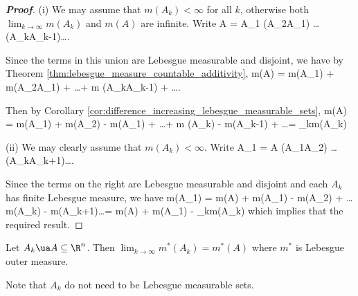 \begin{proof}[\bf Proof]
\ben
\item [(i)] We may assume that $m(A_k) < \infty$ for all $k$, otherwise both $\lim_{k\to \infty} m(A_k)$ and $m(A)$ are infinite. Write
\be
A = A_1 \cup (A_2\bs A_1) \cup \dots \cup (A_k\bs A_{k-1})\cup \dots.
\ee

Since the terms in this union are Lebesgue measurable and disjoint, we have by Theorem \ref{thm:lebesgue_measure_countable_additivity},
\be
m(A) = m(A_1) + m(A_2\bs A_1) + \dots + m (A_k\bs A_{k-1}) + \dots.
\ee

Then by Corollary \ref{cor:difference_increasing_lebesgue_measurable_sets}, 
\be
m(A) = m(A_1) + m(A_2) - m(A_1) + \dots + m (A_k) - m(A_{k-1}) + \dots = \lim_{k\to \infty}m(A_{k})
\ee

\item [(ii)] We may clearly assume that $m(A_k) < \infty$. Write
\be
A_1 = A \cup (A_1\bs A_2) \cup \dots \cup (A_k\bs A_{k+1})\cup \dots.
\ee

Since the terms on the right are Lebesgue measurable and disjoint and each $A_k$ has finite Lebesgue measure, we have
\be
m(A_1) =  m(A) + m(A_1) - m(A_2) + \dots  m(A_k) - m(A_{k+1})\cup \dots = m(A) + m(A_1) - \lim_{k\to \infty}m(A_{k})
\ee
which implies that the required result.
\een
\end{proof}

\begin{theorem}
Let $A_k\ua A\subseteq \R^n$. Then $\lim_{k\to \infty}m^*(A_{k}) = m^*(A)$ where $m^*$ is Lebesgue outer measure.
\end{theorem}

\begin{remark}
Note that $A_k$ do not need to be Lebesgue measurable sets.
\end{remark}

